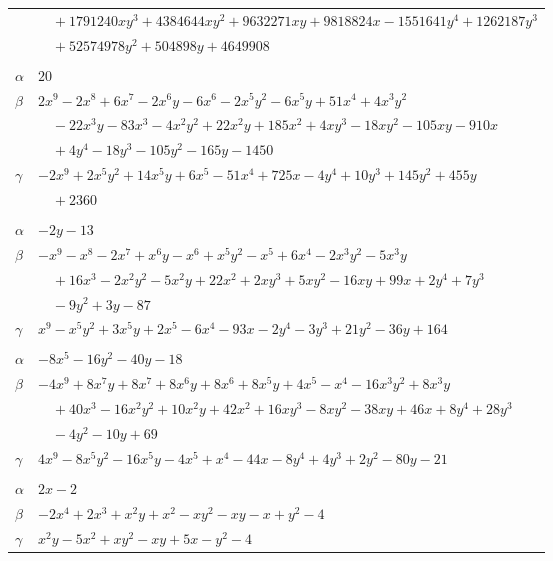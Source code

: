 \documentclass[11pt]{article}
\begin{document}
\begin{longtable}{@{}ll@{}}
 & $\quad +1791240xy^{3}+4384644xy^{2}+9632271xy+9818824x-1551641y^{4}+1262187y^{3}$\\
 & $\quad +52574978y^{2}+504898y+4649908$\\
\addlinespace[3pt]
\multicolumn{2}{@{}l}{$\{i,j\}=\{24,31\}$, $k_{ij}=2^{6}\cdot 3\cdot 5^{2}$}\\
$\alpha$ & $20$\\
$\beta$ & $2x^{9}-2x^{8}+6x^{7}-2x^{6}y-6x^{6}-2x^{5}y^{2}-6x^{5}y+51x^{4}+4x^{3}y^{2}$\\
 & $\quad -22x^{3}y-83x^{3}-4x^{2}y^{2}+22x^{2}y+185x^{2}+4xy^{3}-18xy^{2}-105xy-910x$\\
 & $\quad +4y^{4}-18y^{3}-105y^{2}-165y-1450$\\
$\gamma$ & $-2x^{9}+2x^{5}y^{2}+14x^{5}y+6x^{5}-51x^{4}+725x-4y^{4}+10y^{3}+145y^{2}+455y$\\
 & $\quad +2360$\\
\addlinespace[3pt]
\multicolumn{2}{@{}l}{$\{i,j\}=\{25,27\}$, $k_{ij}=3^{3}\cdot 7$}\\
$\alpha$ & $-2y-13$\\
$\beta$ & $-x^{9}-x^{8}-2x^{7}+x^{6}y-x^{6}+x^{5}y^{2}-x^{5}+6x^{4}-2x^{3}y^{2}-5x^{3}y$\\
 & $\quad +16x^{3}-2x^{2}y^{2}-5x^{2}y+22x^{2}+2xy^{3}+5xy^{2}-16xy+99x+2y^{4}+7y^{3}$\\
 & $\quad -9y^{2}+3y-87$\\
$\gamma$ & $x^{9}-x^{5}y^{2}+3x^{5}y+2x^{5}-6x^{4}-93x-2y^{4}-3y^{3}+21y^{2}-36y+164$\\
\addlinespace[3pt]
\multicolumn{2}{@{}l}{$\{i,j\}=\{25,32\}$, $k_{ij}=2\cdot 3^{2}$}\\
$\alpha$ & $-8x^{5}-16y^{2}-40y-18$\\
$\beta$ & $-4x^{9}+8x^{7}y+8x^{7}+8x^{6}y+8x^{6}+8x^{5}y+4x^{5}-x^{4}-16x^{3}y^{2}+8x^{3}y$\\
 & $\quad +40x^{3}-16x^{2}y^{2}+10x^{2}y+42x^{2}+16xy^{3}-8xy^{2}-38xy+46x+8y^{4}+28y^{3}$\\
 & $\quad -4y^{2}-10y+69$\\
$\gamma$ & $4x^{9}-8x^{5}y^{2}-16x^{5}y-4x^{5}+x^{4}-44x-8y^{4}+4y^{3}+2y^{2}-80y-21$\\
\addlinespace[3pt]
\multicolumn{2}{@{}l}{$\{i,j\}=\{26,30\}$, $k_{ij}=2^{3}$}\\
$\alpha$ & $2x-2$\\
$\beta$ & $-2x^{4}+2x^{3}+x^{2}y+x^{2}-xy^{2}-xy-x+y^{2}-4$\\
$\gamma$ & $x^{2}y-5x^{2}+xy^{2}-xy+5x-y^{2}-4$\\

\end{longtable}
\end{document}
